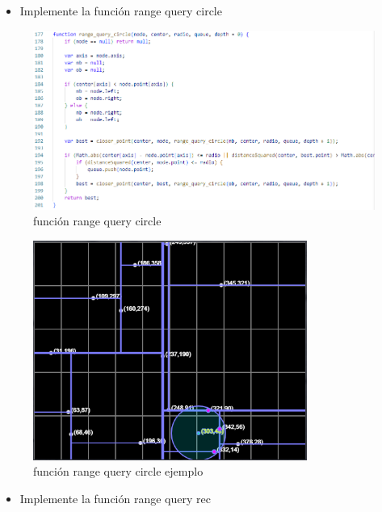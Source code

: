 \documentclass{article}
\begin{document}
\begin{enumerate}
\begin{itemize}
   \item Implemente la función range query circle
\end{itemize}

\begin{figure}[H]
\centering
\includegraphics[width=1.1\textwidth]{Img/range_circle.png}
\caption{función range query circle}
\end{figure}

\begin{figure}[H]
\centering
\includegraphics[width=0.8\textwidth]{Img/range_circle_ej.png}
\caption{función range query circle ejemplo}
\end{figure}

\begin{itemize}
   \item Implemente la función range query rec
\end{itemize}


\end{enumerate}
\end{document}
